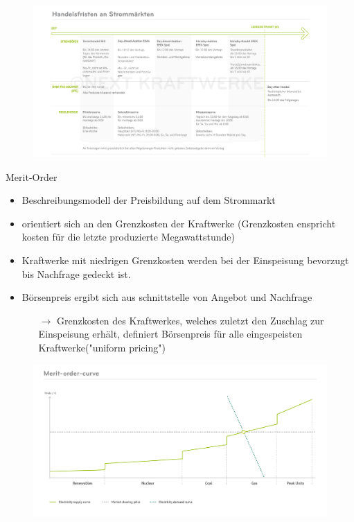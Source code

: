 \documentclass[aspectratio=1610, professionalfonts, 9pt]{beamer}
\begin{document}
{
\begin{frame}
  \begin{figure}
  \includegraphics[width=1.1\textwidth]{images/stromprodukte.jpg}
\end{figure}
\end{frame}
}

\begin{frame}{Merit-Order}
\begin{itemize}
  \item Beschreibungsmodell der Preisbildung auf dem Strommarkt
  \item orientiert sich an den Grenzkosten der Kraftwerke
  (Grenzkosten enspricht kosten für die letzte produzierte Megawattstunde)
\item Kraftwerke mit niedrigen Grenzkosten werden bei der
 Einspeisung bevorzugt bis Nachfrage gedeckt ist.
\item Börsenpreis ergibt sich aus schnittstelle von Angebot und Nachfrage
\begin{itemize}
  \item[$\rightarrow$] Grenzkosten des Kraftwerkes, welches zuletzt den
  Zuschlag zur Einspeisung erhält, definiert Börsenpreis für alle eingespeisten Kraftwerke("uniform pricing")
\end{itemize}
\end{itemize}
\end{frame}

{
\begin{frame}
  \begin{figure}
  \includegraphics[width=1\textwidth]{images/Merit-order-curve-2.jpg}
\end{figure}
\end{frame}
}
\end{document}

